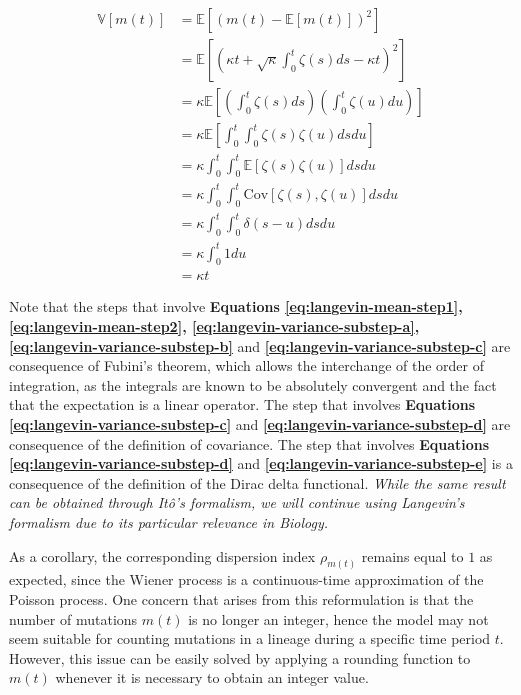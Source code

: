 \begin{align}
    \mathbb{V}\left[m(t)\right] &= \mathbb{E}\left[\left(m(t) - \mathbb{E}\left[m(t)\right]\right)^2\right]\\
    &= \mathbb{E}\left[\left(\kappa t + \sqrt{\kappa}\int_0^t \zeta(s)ds - \kappa t \right)^2\right]\nonumber\\
    &= \kappa\mathbb{E}\left[\left(\int_0^t \zeta(s)ds\right)\left(\int_0^t \zeta(u)du\right)\right]\label{eq:langevin-variance-substep-a}\\
    &= \kappa\mathbb{E}\left[\int_0^t\int_0^t \zeta(s)\zeta(u)dsdu\right]\label{eq:langevin-variance-substep-b}\\
    &= \kappa\int_0^t\int_0^t \mathbb{E}\left[\zeta(s)\zeta(u)\right]dsdu\label{eq:langevin-variance-substep-c}\\
    &= \kappa\int_0^t\int_0^t \text{Cov}\left[\zeta(s),\zeta(u)\right]dsdu\label{eq:langevin-variance-substep-d}\\
    &= \kappa\int_0^t\int_0^t \delta(s-u) dsdu\label{eq:langevin-variance-substep-e}\\
    &= \kappa\int_0^t1du\nonumber\\
    &= \kappa t\label{eq:langevin-variance}
\end{align}

Note that the steps that involve \textbf{Equations \ref{eq:langevin-mean-step1}, \ref{eq:langevin-mean-step2}, \ref{eq:langevin-variance-substep-a}, \ref{eq:langevin-variance-substep-b}} and \textbf{\ref{eq:langevin-variance-substep-c}} are consequence of Fubini's theorem, which allows the interchange of the order of integration, as the integrals are known to be absolutely convergent and the fact that the expectation is a linear operator. The step that involves \textbf{Equations \ref{eq:langevin-variance-substep-c}} and \textbf{\ref{eq:langevin-variance-substep-d}} are consequence of the definition of covariance. The step that involves \textbf{Equations \ref{eq:langevin-variance-substep-d}} and \textbf{\ref{eq:langevin-variance-substep-e}} is a consequence of the definition of the Dirac delta functional. \textit{While the same result can be obtained through Itô's formalism, we will continue using Langevin's formalism due to its particular relevance in Biology.}

As a corollary, the corresponding dispersion index $\rho_{m(t)}$ remains equal to $1$ as expected, since the Wiener process is a continuous-time approximation of the Poisson process. One concern that arises from this reformulation is that the number of mutations $m(t)$ is no longer an integer, hence the model may not seem suitable for counting mutations in a lineage during a specific time period $t$. However, this issue can be easily solved by applying a rounding function to $m(t)$ whenever it is necessary to obtain an integer value.

